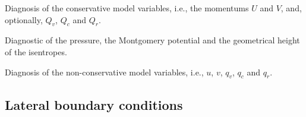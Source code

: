\documentclass[letterpaper,10pt,english]{sphinxmanual}
\begin{document}
\begin{fulllineitems}
\begin{fulllineitems}
\begin{quote}
\begin{description}
\end{description}\end{quote}

\end{fulllineitems}


\begin{fulllineitems}
\label{\detokenize{api:dycore.isentropic_diagnostic.IsentropicDiagnostic.get_conservative_variables}}
Diagnosis of the conservative model variables, i.e., the momentums \(U\) and \(V\),
and, optionally, \(Q_v\), \(Q_c\) and \(Q_r\).

\end{fulllineitems}


\begin{fulllineitems}
\label{\detokenize{api:dycore.isentropic_diagnostic.IsentropicDiagnostic.get_diagnostic_variables}}
Diagnostic of the pressure, the Montgomery potential and the geometrical height of the isentropes.

\end{fulllineitems}


\begin{fulllineitems}
\label{\detokenize{api:dycore.isentropic_diagnostic.IsentropicDiagnostic.get_nonconservative_variables}}
Diagnosis of the non-conservative model variables, i.e., \(u\), \(v\), \(q_v\),
\(q_c\) and \(q_r\).

\end{fulllineitems}


\end{fulllineitems}



\subsection{Lateral boundary conditions}
\label{\detokenize{api:lateral-boundary-conditions}}
\end{document}
